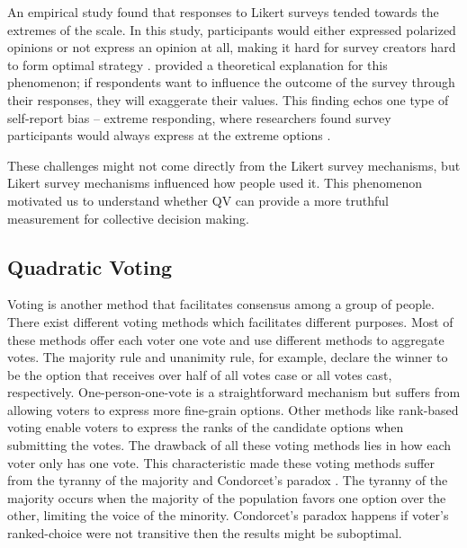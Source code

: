 An empirical study \cite{quarfoot2017quadratic} found that responses to Likert surveys tended towards the extremes of the scale. In this study, participants would either expressed polarized opinions or not express an opinion at all, making it hard for survey creators hard to form optimal strategy \cite{posner2018radical}. \textcite{cavaille2018towards}  provided a theoretical explanation for this phenomenon; if respondents want to influence the outcome of the survey through their responses, they will exaggerate their values. This finding echos one type of self-report bias -- extreme responding, where researchers found survey participants would always express at the extreme options \cite{meisenberg2008acquiescent, furnham1986response}. 

These challenges might not come directly from the Likert survey mechanisms, but Likert survey mechanisms influenced how people used it. This phenomenon motivated us to understand whether QV can provide a more truthful measurement for collective decision making.\par

\subsection{Quadratic Voting}
Voting is another method that facilitates consensus among a group of people. There exist different voting methods which facilitates different purposes. Most of these methods offer each voter one vote and use different methods to aggregate votes. The majority rule and unanimity rule, for example, declare the winner to be the option that receives over half of all votes case or all votes cast, respectively. One-person-one-vote is a straightforward mechanism but suffers from allowing voters to express more fine-grain options\cite{sep-voting-methods}. Other methods like rank-based voting enable voters to express the ranks of the candidate options when submitting the votes. The drawback of all these voting methods lies in how each voter only has one vote. This characteristic made these voting methods suffer from the tyranny of the majority and Condorcet's paradox \cite{sep-voting-methods}. The tyranny of the majority occurs when the majority of the population favors one option over the other, limiting the voice of the minority. Condorcet's paradox happens if voter's ranked-choice were not transitive then the results might be suboptimal.

